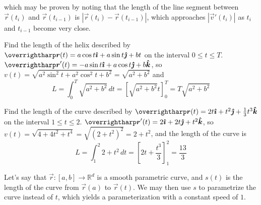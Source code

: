 \documentclass[../main.tex]{subfiles}
\begin{document}
        which may be proven by noting that the length of the line segment between \(\vec{r}(t_i)\) and \(\vec{r}(t_{i-1})\) is \(|\vec{r}(t_i)-\vec{r}(t_{i-1})|\), which approaches \(|\vec{v}'(t_i)|\) as \(t_i\) and \(t_{i-1}\) become very close.
        \begin{example}{}{}
                Find the length of the helix described by \(\vec{r}(t)=a\cos{t}\i+a\sin{t}\j+bt\) on the interval \(0\leq t \leq T\).
                \tcblower
                \(\vec{r}'(t)=-a\sin{t}\i+a\cos{t}\j+b\k\), so \(v(t)=\sqrt{a^2\sin^2{t}+a^2\cos^2{t}+b^2}=\sqrt{a^2+b^2}\) and
                \[
                L = \int_0^T \sqrt{a^2+b^2}\,dt = \left[\sqrt{a^2+b^2}t\right]_0^T = T\sqrt{a^2+b^2}
                \]
        \end{example}
        \begin{example}{}{}
                Find the length of the curve described by \(\vec{r}(t)=2t\i+t^2\j+\frac{1}{3}t^3\k\) on the interval \(1\leq t \leq 2\).
                \tcblower
                \(\vec{r}'(t)=2\i+2t\j+t^2\k\), so \(v(t)=\sqrt{4+4t^2+t^4}=\sqrt{(2+t^2)^2}=2+t^2\), and the length of the curve is
                \[
                L = \int_1^2 2+t^2\,dt = \left[2t+\frac{t^3}{3}\right]_1^2 = \frac{13}{3}
                \]
        \end{example}
        Let's say that \(\vec{r}:[a,b]\to\mathbb{R}^d\) is a smooth parametric curve, and \(s(t)\) is the length of the curve from \(\vec{r}(a)\) to \(\vec{r}(t)\). We may then use \(s\) to parametrize the curve instead of \(t\), which yields a parameterization with a constant speed of \(1\).
\end{document}
